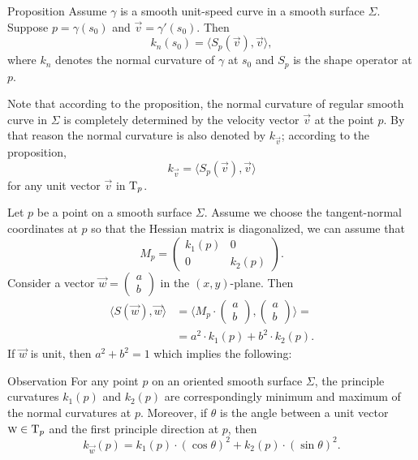 \begin{thm}{Proposition}\label{prop:normal-shape}
Assume $\gamma$ is a smooth unit-speed curve in a smooth surface $\Sigma$.
Suppose $p=\gamma(s_0)$ and $\vec v=\gamma'(s_0)$.
Then 
\[k_n(s_0)=\langle S_p(\vec v),\vec v\rangle,\]
where $k_n$ denotes the normal curvature of $\gamma$ at $s_0$ and $S_p$ is the shape operator at $p$.
\end{thm}

Note that according to the proposition, the normal curvature of regular smooth curve in $\Sigma$ is completely determined by the velocity vector $\vec v$ at the point $p$.
By that reason the normal curvature is also denoted by $k_{\vec v}$;
according to the proposition,
\[k_{\vec v}=\langle S_p(\vec v),\vec v\rangle\]
for any unit vector $\vec v$ in $\mathrm{T}_p$.







Let $p$ be a point on a smooth surface $\Sigma$.
Assume we choose the tangent-normal coordinates at $p$ so that the Hessian matrix is diagonalized, we can assume that
\[M_p=\begin{pmatrix}
   k_1(p)
   &0
   \\
   0
   &k_2(p)
  \end{pmatrix}.
\]
Consider a vector ${\vec w}=(\begin{smallmatrix}a\\b
\end{smallmatrix})$ in the $(x,y)$-plane.
Then
\begin{align*}
\langle S(\vec w),\vec w\rangle
&=\langle M_p\cdot(\begin{smallmatrix}a\\b
\end{smallmatrix}),(\begin{smallmatrix}a\\b
\end{smallmatrix})\rangle=
\\
&=a^2\cdot k_1(p) +b^2\cdot k_2(p). 
\end{align*}
If ${\vec w}$ is unit, then $a^2+b^2=1$ which implies the following:

\begin{thm}{Observation}\label{obs:k1-k2}
For any point $p$ on an oriented smooth surface $\Sigma$,
the principle curvatures $k_1(p)$ and $k_2(p)$ are correspondingly minimum and maximum of the normal curvatures at $p$.
Moreover, if $\theta$ is the angle between a unit vector ${\textsc w}\in\mathrm{T}_p$ and the first principle direction at $p$, then 
\[k_{\vec w}(p)=k_1(p)\cdot(\cos\theta)^2+k_2(p)\cdot(\sin\theta)^2.\]

\end{thm}

